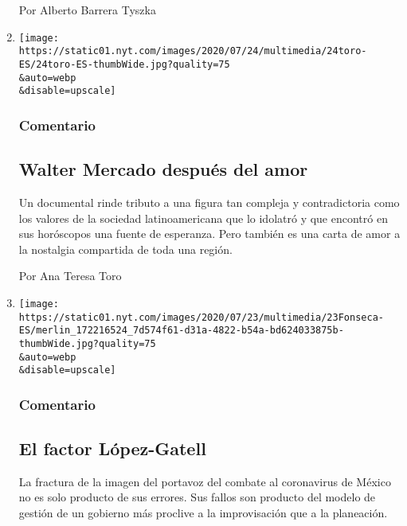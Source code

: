 \begin{enumerate}
  Por Alberto Barrera Tyszka
\item
  \href{/es/2020/07/24/espanol/opinion/walter-mercado-amor-netflix.html}{}

  \texttt{[image: https://static01.nyt.com/images/2020/07/24/multimedia/24toro-ES/24toro-ES-thumbWide.jpg?quality=75\\\&auto=webp\\\&disable=upscale]}

  \hypertarget{comentario-9}{%
  \subsubsection{Comentario}\label{comentario-9}}

  \hypertarget{walter-mercado-despuuxe9s-del-amor}{%
  \subsection{Walter Mercado después del
  amor}\label{walter-mercado-despuuxe9s-del-amor}}

  Un documental rinde tributo a una figura tan compleja y contradictoria
  como los valores de la sociedad latinoamericana que lo idolatró y que
  encontró en sus horóscopos una fuente de esperanza. Pero también es
  una carta de amor a la nostalgia compartida de toda una región.

  Por Ana Teresa Toro
\item
  \href{/es/2020/07/23/espanol/opinion/lopez-gatell.html}{}

  \texttt{[image: https://static01.nyt.com/images/2020/07/23/multimedia/23Fonseca-ES/merlin\_172216524\_7d574f61-d31a-4822-b54a-bd624033875b-thumbWide.jpg?quality=75\\\&auto=webp\\\&disable=upscale]}

  \hypertarget{comentario-10}{%
  \subsubsection{Comentario}\label{comentario-10}}

  \hypertarget{el-factor-luxf3pez-gatell}{%
  \subsection{El factor López-Gatell}\label{el-factor-luxf3pez-gatell}}

  La fractura de la imagen del portavoz del combate al coronavirus de
  México no es solo producto de sus errores. Sus fallos son producto del
  modelo de gestión de un gobierno más proclive a la improvisación que a
  la planeación.


\end{enumerate}
